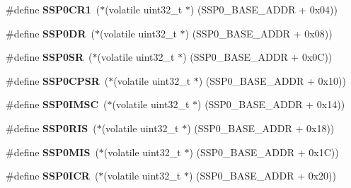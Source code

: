\begin{DoxyCompactItemize}
\mbox{\label{group__lpc24xx__regs_ga3808bb825f6b60e52c2a85d5d1144b17}} 
\#define {\bfseries S\+S\+P0\+C\+R1}~($\ast$(volatile uint32\+\_\+t $\ast$) (S\+S\+P0\+\_\+\+B\+A\+S\+E\+\_\+\+A\+D\+DR + 0x04))
\item 
\mbox{\label{group__lpc24xx__regs_gaa2d0cfacb7d31fc5d8900fb8fd56a5d8}} 
\#define {\bfseries S\+S\+P0\+DR}~($\ast$(volatile uint32\+\_\+t $\ast$) (S\+S\+P0\+\_\+\+B\+A\+S\+E\+\_\+\+A\+D\+DR + 0x08))
\item 
\mbox{\label{group__lpc24xx__regs_ga99763ac6d05808a6a24e8ad528014b85}} 
\#define {\bfseries S\+S\+P0\+SR}~($\ast$(volatile uint32\+\_\+t $\ast$) (S\+S\+P0\+\_\+\+B\+A\+S\+E\+\_\+\+A\+D\+DR + 0x0\+C))
\item 
\mbox{\label{group__lpc24xx__regs_gacb95c5b194a35e74e664f3fa15d9a6d0}} 
\#define {\bfseries S\+S\+P0\+C\+P\+SR}~($\ast$(volatile uint32\+\_\+t $\ast$) (S\+S\+P0\+\_\+\+B\+A\+S\+E\+\_\+\+A\+D\+DR + 0x10))
\item 
\mbox{\label{group__lpc24xx__regs_ga48bd57aefd7177bf7841061e7a3107d9}} 
\#define {\bfseries S\+S\+P0\+I\+M\+SC}~($\ast$(volatile uint32\+\_\+t $\ast$) (S\+S\+P0\+\_\+\+B\+A\+S\+E\+\_\+\+A\+D\+DR + 0x14))
\item 
\mbox{\label{group__lpc24xx__regs_ga61a7f913486366713699472524c234b8}} 
\#define {\bfseries S\+S\+P0\+R\+IS}~($\ast$(volatile uint32\+\_\+t $\ast$) (S\+S\+P0\+\_\+\+B\+A\+S\+E\+\_\+\+A\+D\+DR + 0x18))
\item 
\mbox{\label{group__lpc24xx__regs_ga90a7f06d9b3ff9752fa3c3f5e57be06e}} 
\#define {\bfseries S\+S\+P0\+M\+IS}~($\ast$(volatile uint32\+\_\+t $\ast$) (S\+S\+P0\+\_\+\+B\+A\+S\+E\+\_\+\+A\+D\+DR + 0x1\+C))
\item 
\mbox{\label{group__lpc24xx__regs_ga8054b085e34d7ee292b0444acbef589b}} 
\#define {\bfseries S\+S\+P0\+I\+CR}~($\ast$(volatile uint32\+\_\+t $\ast$) (S\+S\+P0\+\_\+\+B\+A\+S\+E\+\_\+\+A\+D\+DR + 0x20))
\item 
\mbox{\label{group__lpc24xx__regs_ga0fb4b46d2318de8fe99b0b08372c0ee4}} 

\end{DoxyCompactItemize}
